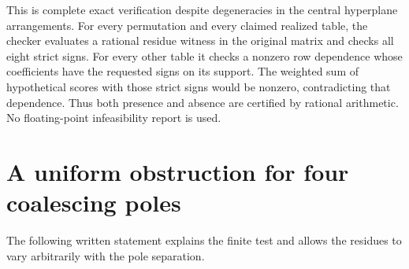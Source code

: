 \documentclass[11pt]{article}
\begin{document}
This is complete exact verification despite degeneracies in the
central hyperplane arrangements. For every permutation and every
claimed realized table, the checker evaluates a rational residue
witness in the original matrix and checks all eight strict signs.
For every other table it checks a nonzero row dependence whose
coefficients have the requested signs on its support. The weighted
sum of hypothetical scores with those strict signs would be nonzero,
contradicting that dependence. Thus both presence and absence are
certified by rational arithmetic. No floating-point infeasibility
report is used.

\section{A uniform obstruction for four coalescing poles}
The following written statement explains the finite test and allows
the residues to vary arbitrarily with the pole separation.
\end{document}
